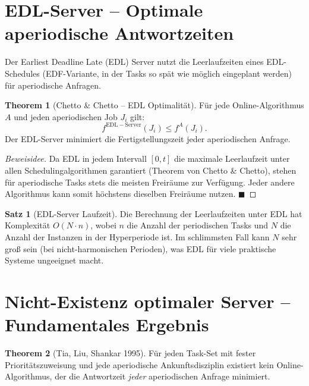 ﻿\documentclass[a4paper,12pt]{report}
\theoremstyle{definition}
\newtheorem{satz}{Satz}[chapter]
\newtheorem{theorem}{Theorem}[chapter]
\begin{document}
\section{EDL-Server -- Optimale aperiodische Antwortzeiten}

Der Earliest Deadline Late (EDL) Server nutzt die Leerlaufzeiten eines EDL-Schedules
(EDF-Variante, in der Tasks so spät wie möglich eingeplant werden) für aperiodische
Anfragen.

\begin{theorem}[Chetto \& Chetto -- EDL Optimalität]
	Für jede Online-Algorithmus $A$ und jeden aperiodischen Job $J_i$ gilt:
	\[
		f^{\mathrm{EDL-Server}}(J_i) \leq f^A(J_i).
	\]
	Der EDL-Server minimiert die Fertigstellungszeit jeder aperiodischen Anfrage.
\end{theorem}

\begin{proof}[Beweisidee]
	Da EDL in jedem Intervall $[0,t]$ die maximale Leerlaufzeit unter allen
	Schedulingalgorithmen garantiert (Theorem von Chetto \& Chetto), stehen
	für aperiodische Tasks stets die meisten Freiräume zur Verfügung. Jeder andere
	Algorithmus kann somit höchstens dieselben Freiräume nutzen. \hfill$\blacksquare$
\end{proof}

\begin{satz}[EDL-Server Laufzeit]
	Die Berechnung der Leerlaufzeiten unter EDL hat Komplexität $O(N \cdot n)$,
	wobei $n$ die Anzahl der periodischen Tasks und $N$ die Anzahl der
	Instanzen in der Hyperperiode ist. Im schlimmsten Fall kann $N$ sehr groß
	sein (bei nicht-harmonischen Perioden), was EDL für viele praktische Systeme
	ungeeignet macht.
\end{satz}

\section{Nicht-Existenz optimaler Server -- Fundamentales Ergebnis}

\begin{theorem}[Tia, Liu, Shankar 1995]
	Für jeden Task-Set mit fester Prioritätszuweisung und jede aperiodische
	Ankunftsdisziplin existiert kein Online-Algorithmus, der die Antwortzeit
	\emph{jeder} aperiodischen Anfrage minimiert.
\end{theorem}
\end{document}
